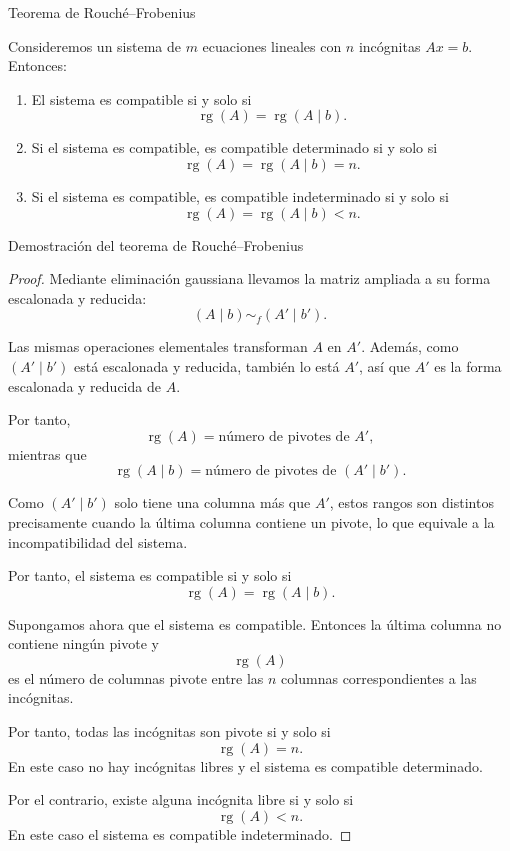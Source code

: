 \begin{frame}{Teorema de Rouché--Frobenius}

\begin{theorem}
Consideremos un sistema de \(m\) ecuaciones lineales con \(n\)
incógnitas
\(
Ax=b.
\)
Entonces:
\begin{enumerate}
\item El sistema es \alert{compatible} si y solo si
\[
\operatorname{rg}(A)=\operatorname{rg}(A\mid b).
\]

\item Si el sistema es compatible, es
\alert{compatible determinado} si y solo si
\[
\operatorname{rg}(A)=\operatorname{rg}(A\mid b)=n.
\]

\item Si el sistema es compatible, es
\alert{compatible indeterminado} si y solo si
\[
\operatorname{rg}(A)=\operatorname{rg}(A\mid b)<n.
\]
\end{enumerate}
\end{theorem}

\end{frame}


\begin{frame}[allowframebreaks, t]{Demostración del teorema de Rouché--Frobenius}

\begin{proof}
Mediante eliminación gaussiana llevamos la matriz ampliada a su
forma escalonada y reducida:
\[
(A\mid b)\sim_f(A'\mid b').
\]

Las mismas operaciones elementales transforman \(A\) en \(A'\).
Además, como \((A'\mid b')\) está escalonada y reducida, también
lo está \(A'\), así que
\(A'\) es la forma escalonada y reducida de \(A\).

Por tanto,
\[
\operatorname{rg}(A)
=
\text{número de pivotes de }A',
\]
mientras que
\[
\operatorname{rg}(A\mid b)
=
\text{número de pivotes de }(A'\mid b').
\]

Como \((A'\mid b')\) solo tiene una columna más que \(A'\), estos
rangos son distintos precisamente cuando la última columna contiene
un pivote, lo que equivale a la incompatibilidad del sistema.

Por tanto, el sistema es compatible si y solo si
\[
\operatorname{rg}(A)=\operatorname{rg}(A\mid b).
\]

Supongamos ahora que el sistema es compatible. Entonces la última
columna no contiene ningún pivote y
\[
\operatorname{rg}(A)
\]
es el número de columnas pivote entre las \(n\) columnas
correspondientes a las incógnitas.

Por tanto, todas las incógnitas son pivote si y solo si
\[
\operatorname{rg}(A)=n.
\]
En este caso no hay incógnitas libres y el sistema es compatible
determinado.

Por el contrario, existe alguna incógnita libre si y solo si
\[
\operatorname{rg}(A)<n.
\]
En este caso el sistema es compatible indeterminado.
\end{proof}

\end{frame}

